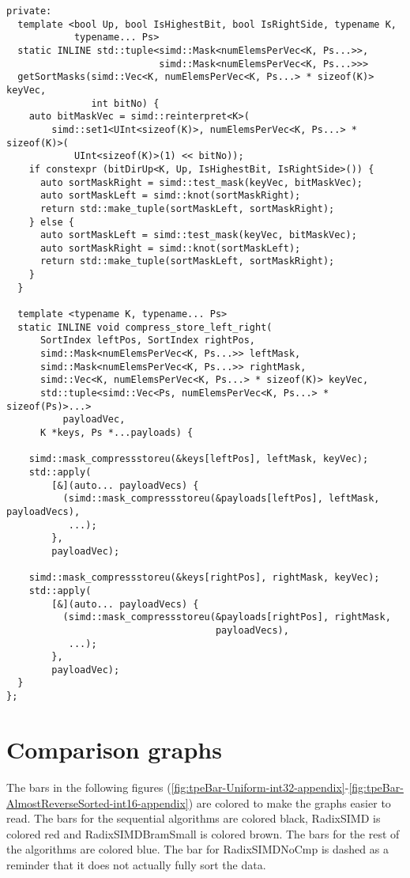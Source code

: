 \documentclass[12pt, a4paper, openright, twoside]{tiarbeit}
\begin{document}
\begin{verbatim}
private:
  template <bool Up, bool IsHighestBit, bool IsRightSide, typename K,
            typename... Ps>
  static INLINE std::tuple<simd::Mask<numElemsPerVec<K, Ps...>>,
                           simd::Mask<numElemsPerVec<K, Ps...>>>
  getSortMasks(simd::Vec<K, numElemsPerVec<K, Ps...> * sizeof(K)> keyVec,
               int bitNo) {
    auto bitMaskVec = simd::reinterpret<K>(
        simd::set1<UInt<sizeof(K)>, numElemsPerVec<K, Ps...> * sizeof(K)>(
            UInt<sizeof(K)>(1) << bitNo));
    if constexpr (bitDirUp<K, Up, IsHighestBit, IsRightSide>()) {
      auto sortMaskRight = simd::test_mask(keyVec, bitMaskVec);
      auto sortMaskLeft = simd::knot(sortMaskRight);
      return std::make_tuple(sortMaskLeft, sortMaskRight);
    } else {
      auto sortMaskLeft = simd::test_mask(keyVec, bitMaskVec);
      auto sortMaskRight = simd::knot(sortMaskLeft);
      return std::make_tuple(sortMaskLeft, sortMaskRight);
    }
  }

  template <typename K, typename... Ps>
  static INLINE void compress_store_left_right(
      SortIndex leftPos, SortIndex rightPos,
      simd::Mask<numElemsPerVec<K, Ps...>> leftMask,
      simd::Mask<numElemsPerVec<K, Ps...>> rightMask,
      simd::Vec<K, numElemsPerVec<K, Ps...> * sizeof(K)> keyVec,
      std::tuple<simd::Vec<Ps, numElemsPerVec<K, Ps...> * sizeof(Ps)>...>
          payloadVec,
      K *keys, Ps *...payloads) {

    simd::mask_compressstoreu(&keys[leftPos], leftMask, keyVec);
    std::apply(
        [&](auto... payloadVecs) {
          (simd::mask_compressstoreu(&payloads[leftPos], leftMask, payloadVecs),
           ...);
        },
        payloadVec);

    simd::mask_compressstoreu(&keys[rightPos], rightMask, keyVec);
    std::apply(
        [&](auto... payloadVecs) {
          (simd::mask_compressstoreu(&payloads[rightPos], rightMask,
                                     payloadVecs),
           ...);
        },
        payloadVec);
  }
};
\end{verbatim}

\chapter{Comparison graphs}
\label{appendix:graphs}
The bars in the following figures
(\ref{fig:tpeBar-Uniform-int32-appendix}-\ref{fig:tpeBar-AlmostReverseSorted-int16-appendix})
are colored to make the graphs easier to read.
The bars for the sequential algorithms are colored black,
RadixSIMD is colored red and
RadixSIMDBramSmall is colored brown.
The bars for the rest of the algorithms are colored blue.
The bar for RadixSIMDNoCmp is dashed as a reminder that it does not
actually fully sort the data.
\clearpage
\end{document}
